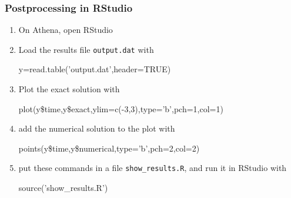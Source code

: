 \documentclass[aspectratio=43,9pt]{beamer}
\begin{document}
\begin{frame}
	\frametitle{Postprocessing in RStudio}
	\begin{enumerate}	
		\item On Athena, open RStudio\vspace*{2ex}
		\item Load the results file \texttt{output.dat} with
			\par\vspace*{1ex}\hspace*{.05\textwidth}\parbox{.8\textwidth}{\ttfamily
				y=read.table('output.dat',header=TRUE)
			}\vspace*{1ex}\par\vspace*{2ex}
		\item Plot the exact solution with
			\par\vspace*{1ex}\hspace*{.05\textwidth}\parbox{.8\textwidth}{\ttfamily
				plot(y\$time,y\$exact,ylim=c(-3,3),type='b',pch=1,col=1)
			}\vspace*{1ex}\par\vspace*{2ex}
		\item add the numerical solution to the plot with
			\par\vspace*{1ex}\hspace*{.05\textwidth}\parbox{.8\textwidth}{\ttfamily
				points(y\$time,y\$numerical,type='b',pch=2,col=2)
			}\vspace*{1ex}\par\vspace*{2ex}
		\item put these commands in a file \texttt{show\_results.R}, and run it in RStudio with
			\par\vspace*{1ex}\hspace*{.05\textwidth}\parbox{.8\textwidth}{\ttfamily
				source('show\_results.R')
			}\vspace*{1ex}\par
	\end{enumerate}
\end{frame}
%
%
\end{document}
